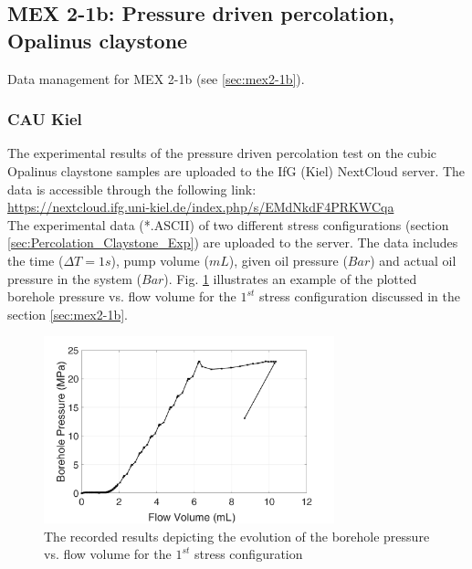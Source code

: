 \subsection{MEX 2-1b: Pressure driven percolation, Opalinus claystone}

Data management for MEX 2-1b (see \ref{sec:mex2-1b}).

\subsubsection*{CAU Kiel}

The experimental results of the pressure driven percolation test on the cubic Opalinus claystone samples are uploaded to the IfG (Kiel) NextCloud server. The data is accessible through the following link:\\
\hyperlink{https://nextcloud.ifg.uni-kiel.de/index.php/s/EMdNkdF4PRKWCqa}{https://nextcloud.ifg.uni-kiel.de/index.php/s/EMdNkdF4PRKWCqa}\\

The experimental data (*.ASCII) of two different stress configurations (section \ref{sec:Percolation_Claystone_Exp}) are uploaded to the server. The data includes the time ($\Delta T=1s$), pump volume ($mL$), given oil pressure ($Bar$) and actual oil pressure in the system ($Bar$). Fig. \ref{fig:Amir_Percolation_Flow_a_Data}
illustrates an example of the plotted borehole pressure vs. flow volume for the $1^{st}$ stress configuration discussed in the section \ref{sec:mex2-1b}.

\begin{figure}[!ht]
\centering
\includegraphics[width=0.75\textwidth]{figures/Amir_Percolation_Flow_a_Data.png}
\caption{The recorded results depicting the evolution of the borehole pressure vs. flow volume for the $1^{st}$ stress configuration}
\label{fig:Amir_Percolation_Flow_a_Data}
\end{figure}

